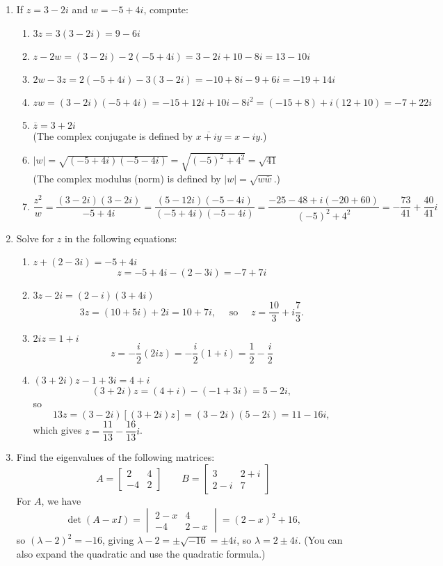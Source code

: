 \documentclass[12pt]{article}
\newcommand{\abs}[1]{\lvert #1\rvert}
\newcommand{\bbm}{\begin{bmatrix}}
\newcommand{\ebm}{\end{bmatrix}}
\newcommand{\bvm}{\begin{vmatrix}}
\newcommand{\evm}{\end{vmatrix}}
\begin{document}
\thispagestyle{fancy}

 \begin{enumerate}
  \item If $z=3-2i$ and $w = -5+4i$, compute:
  \begin{enumerate}
  \item $3z = 3(3-2i) = 9-6i$
  \item $z-2w = (3-2i)-2(-5+4i) = 3-2i+10-8i = 13-10i$
  \item $2w-3z = 2(-5+4i)-3(3-2i) = -10+8i-9+6i = -19+14i$
  \item $zw = (3-2i)(-5+4i) = -15+12i+10i-8i^2 = (-15+8)+i(12+10) = -7+22i$
  \item $\overline{z}=3+2i$ \\(The complex conjugate is defined by $\overline{x+iy}=x-iy$.)
  \item $\abs{w}=\sqrt{(-5+4i)(-5-4i)} = \sqrt{(-5)^2+4^2} = \sqrt{41}$ \\(The complex modulus (norm) is defined by $\abs{w} = \sqrt{w\overline{w}}$.)
  \item $\dfrac{z^2}{w} = \dfrac{(3-2i)(3-2i)}{-5+4i} = \dfrac{(5-12i)(-5-4i)}{(-5+4i)(-5-4i)} = \dfrac{-25-48+i(-20+60)}{(-5)^2+4^2} = -\dfrac{73}{41}+\dfrac{40}{41}i$
  \end{enumerate}
 
  
 \item Solve for $z$ in the following equations:
\begin{enumerate}
\item $z+(2-3i)=-5+4i$
\[
 z = -5+4i-(2-3i) = -7+7i
\]

\item $3z-2i = (2-i)(3+4i)$
\[
 3z=(10+5i)+2i=10+7i, \quad \text{ so } \quad z = \frac{10}{3}+i\frac{7}{3}.
\]

\item $2iz = 1+i$
\[
 z = -\frac{i}{2}(2iz) = -\frac{i}{2}(1+i) = \frac{1}{2}-\frac{i}{2}
\]

\item $(3+2i)z -1+3i = 4+i$
\[
 (3+2i)z = (4+i)-(-1+3i) = 5-2i, 
\]
so 
\[
13z = (3-2i)[(3+2i)z] = (3-2i)(5-2i) = 11-16i, 
\]
which gives $z = \dfrac{11}{13}-\dfrac{16}{13}i$.
\end{enumerate} 
\item Find the eigenvalues of the following matrices:
\[
A = \bbm 2&4\\-4&2\ebm \quad\quad B = \bbm 3&2+i\\2-i&7\ebm
\]
For $A$, we have
\[
 \det(A-xI) = \bvm 2-x&4\\-4&2-x\evm = (2-x)^2+16,
\]
so $(\lambda-2)^2 = -16$, giving $\lambda-2 = \pm\sqrt{-16} = \pm 4i$, so $\lambda=2\pm 4i$. (You can also expand the quadratic and use the quadratic formula.)


\end{enumerate}
\end{document}
